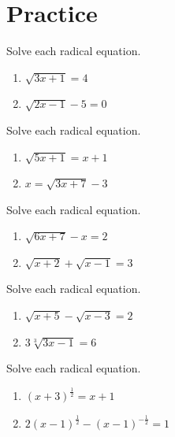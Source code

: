 \documentclass[en,12pt]{elegantbook}
\providecommand{\tightlist}{%
  \setlength{\itemsep}{0pt}\setlength{\parskip}{0pt}}
\let\BeginKnitrBlock\begin \let\EndKnitrBlock\end
\begin{document}
\hypertarget{practice-7}{%
\section{Practice}\label{practice-7}}

\BeginKnitrBlock{exercise}
\protect\hypertarget{exr:unnamed-chunk-192}{}{\label{exr:unnamed-chunk-192} }
Solve each radical equation.

\begin{enumerate}
\def\labelenumi{\arabic{enumi}.}
\tightlist
\item
  \(\sqrt{3x+1}=4\)
\item
  \(\sqrt{2x-1}-5=0\)
\end{enumerate}
\EndKnitrBlock{exercise}

\BeginKnitrBlock{exercise}
\protect\hypertarget{exr:unnamed-chunk-193}{}{\label{exr:unnamed-chunk-193} }
Solve each radical equation.

\begin{enumerate}
\def\labelenumi{\arabic{enumi}.}
\tightlist
\item
  \(\sqrt{5x+1}=x+1\)
\item
  \(x=\sqrt{3x+7}-3\)
\end{enumerate}
\EndKnitrBlock{exercise}

\BeginKnitrBlock{exercise}
\protect\hypertarget{exr:unnamed-chunk-194}{}{\label{exr:unnamed-chunk-194} }
Solve each radical equation.

\begin{enumerate}
\def\labelenumi{\arabic{enumi}.}
\tightlist
\item
  \(\sqrt{6x+7}-x=2\)
\item
  \(\sqrt{x+2}+\sqrt{x-1}=3\)
\end{enumerate}
\EndKnitrBlock{exercise}

\BeginKnitrBlock{exercise}
\protect\hypertarget{exr:unnamed-chunk-195}{}{\label{exr:unnamed-chunk-195} }
Solve each radical equation.

\begin{enumerate}
\def\labelenumi{\arabic{enumi}.}
\tightlist
\item
  \(\sqrt{x+5}-\sqrt{x-3}=2\)
\item
  \(3\sqrt[3]{3x-1}=6\)
\end{enumerate}
\EndKnitrBlock{exercise}

\BeginKnitrBlock{exercise}
\protect\hypertarget{exr:unnamed-chunk-196}{}{\label{exr:unnamed-chunk-196} }
Solve each radical equation.

\begin{enumerate}
\def\labelenumi{\arabic{enumi}.}
\tightlist
\item
  \((x+3)^{\frac12}=x+1\)
\item
  \(2(x-1)^{\frac12}-(x-1)^{-\frac12}=1\)
\end{enumerate}
\EndKnitrBlock{exercise}
\end{document}
